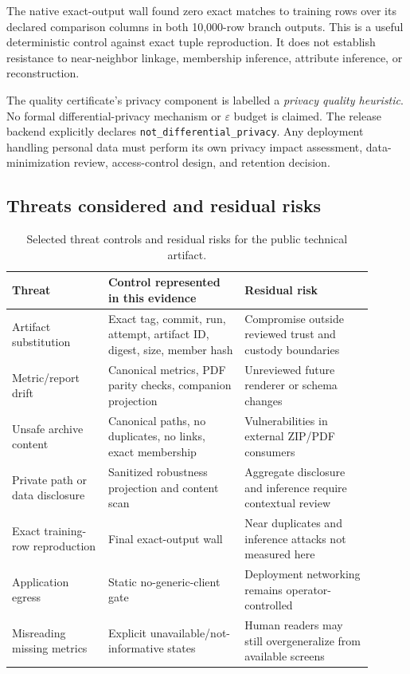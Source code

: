 The native exact-output wall found zero exact matches to training rows over its declared comparison
columns in both 10,000-row branch outputs. This is a useful deterministic control against exact tuple
reproduction. It does not establish resistance to near-neighbor linkage, membership inference,
attribute inference, or reconstruction.

The quality certificate's privacy component is labelled a \emph{privacy quality heuristic}. No
formal differential-privacy mechanism or $\varepsilon$ budget is claimed. The release backend
explicitly declares \texttt{not\_differential\_privacy}. Any deployment handling personal data must
perform its own privacy impact assessment, data-minimization review, access-control design, and
retention decision.

\clearpage
\subsection{Threats considered and residual risks}

\begin{table}[htbp]
\centering
\footnotesize
\AccessibleTableHeaderRow
\begin{tabular}{@{}>{\RaggedRight\arraybackslash}p{0.24\linewidth}
                    >{\RaggedRight\arraybackslash}p{0.34\linewidth}
                    >{\RaggedRight\arraybackslash}p{0.32\linewidth}@{}}
\toprule
Threat & Control represented in this evidence & Residual risk \\
\midrule
Artifact substitution & Exact tag, commit, run, attempt, artifact ID, digest, size, member hash & Compromise outside reviewed trust and custody boundaries \\
Metric/report drift & Canonical metrics, PDF parity checks, companion projection & Unreviewed future renderer or schema changes \\
Unsafe archive content & Canonical paths, no duplicates, no links, exact membership & Vulnerabilities in external ZIP/PDF consumers \\
Private path or data disclosure & Sanitized robustness projection and content scan & Aggregate disclosure and inference require contextual review \\
Exact training-row reproduction & Final exact-output wall & Near duplicates and inference attacks not measured here \\
Application egress & Static no-generic-client gate & Deployment networking remains operator-controlled \\
Misreading missing metrics & Explicit unavailable/not-informative states & Human readers may still overgeneralize from available screens \\
\bottomrule
\end{tabular}
\caption{Selected threat controls and residual risks for the public technical artifact.}
\label{tab:threats}
\end{table}
